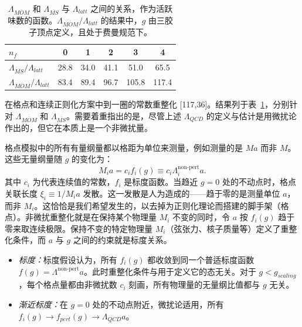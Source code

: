 \begin{table}[htbp]
  \centering
  \begin{tabular}{lccccc}
    \toprule
    $n_f$ & 0 & 1 & 2 & 3 & 4 \\
    \midrule
    $\Lambda_{\overline{MS}}/\Lambda_{latt}$ & 28.8 & 34.0 & 41.1 & 51.0 & 65.5 \\
    $\Lambda_{\overline{MOM}}/\Lambda_{latt}$ & 83.4 & 89.4 & 96.7 & 105.8 & 117.4 \\
    \bottomrule
  \end{tabular}
  \caption{$\Lambda_{\overline{MOM}}$ 和 $\Lambda_{\overline{MS}}$ 与 $\Lambda_{latt}$ 之间的关系，作为活跃味数的函数。$\Lambda_{\overline{MOM}}/\Lambda_{latt}$ 的结果中，$g$ 由三胶子顶点定义，且处于费曼规范下。}
  \label{tab:6}
\end{table}

在格点和连续正则化方案中到一圈的常数重整化 [117,36]。结果列于表~\ref{tab:6}，分别针对 $\Lambda_{\overline{MOM}}$ 和 $\Lambda_{\overline{MS}}$。需要着重指出的是，尽管上述 $\Lambda_{QCD}$ 的定义与估计是用微扰论作出的，但它在本质上是一个非微扰量。

格点模拟中的所有有量纲量都以格距为单位来测量，例如测量的是 $M a$ 而非 $M$。这些无量纲量随 $g$ 的变化为：
\begin{equation}
  M_i a = c_i f_i(g) \equiv c_i \Lambda_i^{\mathrm{non}\text{-}\mathrm{pert}} a .
  \label{eq:scaling-ma}
\end{equation}
其中 $c_i$ 为代表连续值的常数，$f_i$ 是标度函数。当趋近 $g = 0$ 处的不动点时，格点关联长度 $\xi_i \equiv 1/M_i a$ 发散。这一发散是人为造成的——趋于零的是测量单位 $a$，而非 $M_i$。这恰恰是我们希望发生的，以去掉为正则化理论而搭建的脚手架（格点）。非微扰重整化就是在保持某个物理量 $M_i$ 不变的同时，令 $a$ 按 $f_i(g)$ 趋于零来取连续极限。保持不变的特定物理量 $M_i$（弦张力、核子质量等）定义了重整化条件，而 $a$ 与 $g$ 之间的约束就是标度关系。

\begin{itemize}
  \item \textit{标度：}标度假设认为，所有 $f_i(g)$ 都收敛到同一个普适标度函数 $f(g) = \Lambda^{\mathrm{non}\text{-}\mathrm{pert}} a$。此时重整化条件与用于定义它的态无关。对于 $g < g_{scaling}$，每个格点量都由非微扰数 $c_i$ 刻画，所有物理量的无量纲比值都与 $g$ 无关。
  \item \textit{渐近标度：}在 $g = 0$ 处的不动点附近，微扰论适用，所有 $f_i(g) \to f_{pert}(g) \to \Lambda_{QCD} a$。
\end{itemize}

